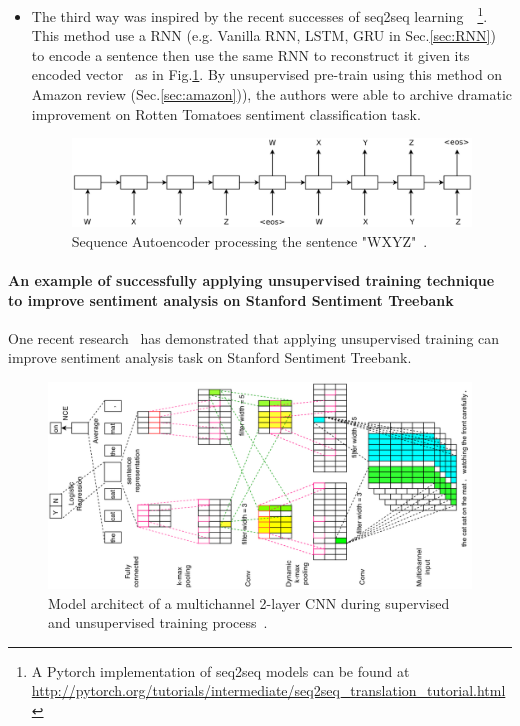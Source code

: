 \begin{itemize}
\item The third way was inspired by the recent successes of seq2seq learning~\cite{SutskeverVL14}~\cite{semisup-seq2seq}\footnote{A Pytorch implementation of seq2seq models can be found at \url{http://pytorch.org/tutorials/intermediate/seq2seq_translation_tutorial.html}}. 
This method use a RNN (e.g. Vanilla RNN, LSTM, GRU in Sec.\ref{sec:RNN}) to encode a sentence then use the same RNN to reconstruct it given its encoded vector~\cite{semisup-seq2seq} as in Fig.\ref{fig:rnn-autoencoder}.
By unsupervised pre-train using this method on Amazon review (Sec.\ref{sec:amazon})), the authors were able to archive dramatic improvement on Rotten Tomatoes sentiment classification task. 

\begin{figure}[H]
    \centering    \includegraphics[scale=0.43]{figure/rnn-autoencoder}
    \caption[Sequence Autoencoder]{Sequence Autoencoder processing the sentence "WXYZ"~\cite{semisup-seq2seq}.}
    \label{fig:rnn-autoencoder}
\end{figure}

\end{itemize}

\paragraph{An example of successfully applying unsupervised training technique to improve sentiment analysis on Stanford Sentiment Treebank} \label{sec:2-layer-cnn}
One recent research~\cite{2-layer-cnn} has demonstrated that applying unsupervised training can improve sentiment analysis task on Stanford Sentiment Treebank.

\begin{figure}
    \centering    \includegraphics[scale=0.5, angle =-90 ]{figure/2-layer-cnn}
    \caption[2-layer CNN]{Model architect of a multichannel 2-layer CNN during supervised and unsupervised training process~\cite{2-layer-cnn}.}
    \label{fig:2-layer-cnn}
\end{figure}

